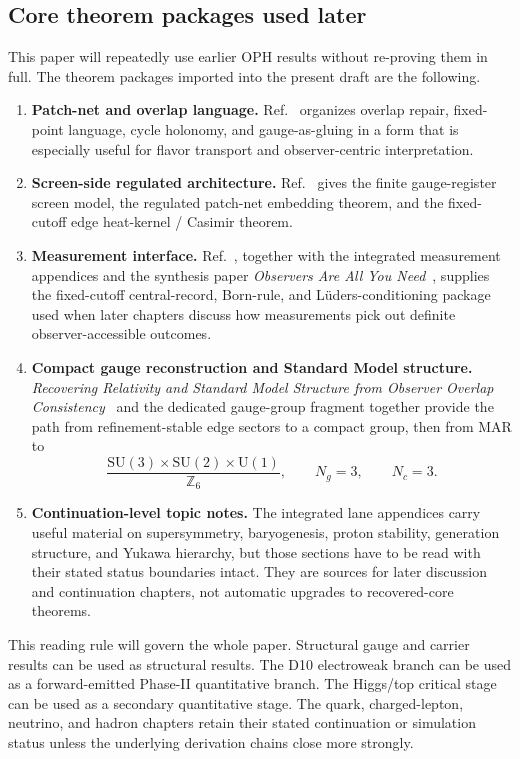 \documentclass[11pt]{article}
\newcommand{\SU}{\mathrm{SU}}
\newcommand{\U}{\mathrm{U}}
\begin{document}
\subsection{Core theorem packages used later}

This paper will repeatedly use earlier OPH results without re-proving them in full. The
theorem packages imported into the present draft are the following.

\begin{enumerate}[leftmargin=2em]
\item \textbf{Patch-net and overlap language.} Ref.~\cite{ophconsensus} organizes overlap repair,
fixed-point language, cycle holonomy, and gauge-as-gluing in a form that is especially useful
for flavor transport and observer-centric interpretation.
\item \textbf{Screen-side regulated architecture.} Ref.~\cite{ophmicrophysics} gives the
finite gauge-register screen model, the regulated patch-net embedding theorem, and the fixed-cutoff
edge heat-kernel / Casimir theorem.
\item \textbf{Measurement interface.} Ref.~\cite{ophmicrophysics}, together with the integrated
measurement appendices and the synthesis paper \emph{Observers Are All You Need}~\cite{ophsynthesis}, supplies the fixed-cutoff central-record, Born-rule, and
L\"uders-conditioning package used when later chapters discuss how measurements pick out definite
observer-accessible outcomes.
\item \textbf{Compact gauge reconstruction and Standard Model structure.}
\emph{Recovering Relativity and Standard Model Structure from Observer Overlap Consistency}~\cite{ophcompact}
and the dedicated gauge-group fragment together provide the path from refinement-stable
edge sectors to a compact group, then from MAR to
\[
\frac{\SU(3)\times\SU(2)\times\U(1)}{\mathbb Z_6},
\qquad
N_g=3,
\qquad
N_c=3.
\]
\item \textbf{Continuation-level topic notes.} The integrated lane appendices carry useful material
on supersymmetry, baryogenesis, proton stability, generation structure, and Yukawa hierarchy,
but those sections have to be read with their stated status boundaries intact. They are sources
for later discussion and continuation chapters, not automatic upgrades to recovered-core theorems.
\end{enumerate}

This reading rule will govern the whole paper. Structural gauge and carrier results can be used
as structural results. The D10 electroweak branch can be used as a forward-emitted Phase-II
quantitative branch. The
Higgs/top critical stage can be used as a secondary quantitative stage. The quark,
charged-lepton, neutrino, and hadron chapters retain their stated continuation or
simulation status unless the underlying derivation chains close more strongly.
\end{document}
